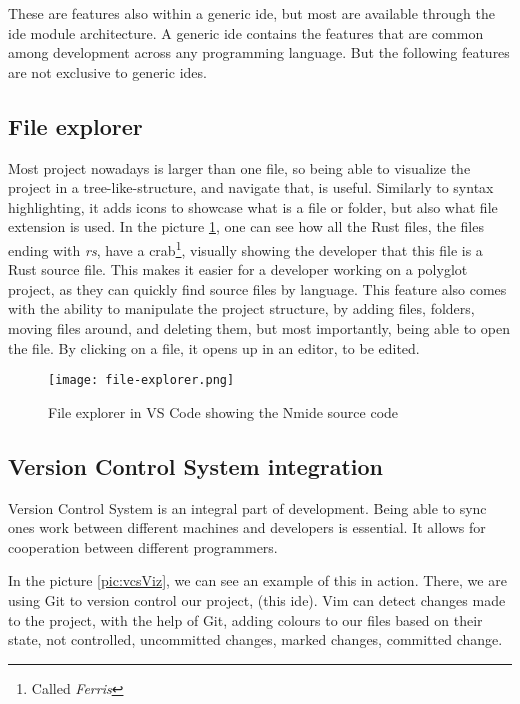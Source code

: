 These are features also within a generic \gls*{ide}, but most are available
through the \gls*{ide} module architecture. A generic \gls*{ide} contains the
features that are common among development across any programming language. But
the following features are not exclusive to generic \gls*{ide}s.

\subsection{File explorer}

Most project nowadays is larger than one file, so being able to visualize the
project in a tree-like-structure, and navigate that, is useful. Similarly to
syntax highlighting, it adds icons to showcase what is a file or folder, but
also what file extension is used. In the picture \ref{pic:fileEx}, one can see
how all the Rust files, the files ending with \textit{rs}, have a crab\footnote{Called \textit{Ferris}},
visually showing the developer that this file is a Rust source file. This makes
it easier for a developer working on a polyglot project, as they can quickly
find source files by language. This feature also comes with the ability to
manipulate the project structure, by adding files, folders, moving files around,
and deleting them, but most importantly, being able to open the file. By
clicking on a file, it opens up in an editor, to be edited.

\begin{figure}
  \centering
  \texttt{[image: file-explorer.png]}
  \caption{File explorer in VS Code showing the Nmide source code}
  \label{pic:fileEx}
\end{figure}

\subsection{Version Control System integration}

Version Control System is an integral part of development. Being able to sync
ones work between different machines and developers is essential. It allows for
cooperation between different programmers.

In the picture \ref{pic:vcsViz}, we can see an example of this in action. There,
we are using Git to version control our project, (this \gls*{ide}). Vim
can detect changes made to the project, with the help of Git, adding colours to
our files based on their state, not controlled, uncommitted changes, marked
changes, committed change.

